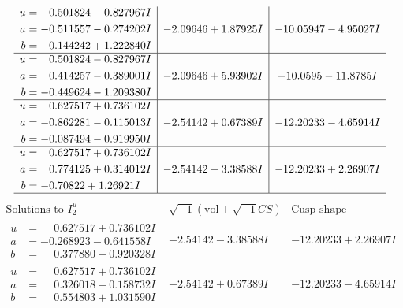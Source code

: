 \documentclass[1p]{elsarticle_modified}
\theoremstyle{definition}
\newcommand{\I}{\sqrt{-1}}
\begin{document}
$$\begin{array}{c|c|c}
\begin{aligned}
u &= \phantom{-}0.501824 - 0.827967 I \\
a &= -0.511557 - 0.274202 I \\
b &= -0.144242 + 1.222840 I\end{aligned}
 & -2.09646 + 1.87925 I & -10.05947 - 4.95027 I \\ \hline\begin{aligned}
u &= \phantom{-}0.501824 - 0.827967 I \\
a &= \phantom{-}0.414257 - 0.389001 I \\
b &= -0.449624 - 1.209380 I\end{aligned}
 & -2.09646 + 5.93902 I & -10.0595 - 11.8785 I \\ \hline\begin{aligned}
u &= \phantom{-}0.627517 + 0.736102 I \\
a &= -0.862281 - 0.115013 I \\
b &= -0.087494 - 0.919950 I\end{aligned}
 & -2.54142 + 0.67389 I & -12.20233 - 4.65914 I \\ \hline\begin{aligned}
u &= \phantom{-}0.627517 + 0.736102 I \\
a &= \phantom{-}0.774125 + 0.314012 I \\
b &= -0.70822 + 1.26921 I\end{aligned}
 & -2.54142 - 3.38588 I & -12.20233 + 2.26907 I\\
 \hline 
 \end{array}$$\newpage$$\begin{array}{c|c|c}  
\text{Solutions to }I^u_{2}& \I (\text{vol} + \sqrt{-1}CS) & \text{Cusp shape}\\
 \hline 
\begin{aligned}
u &= \phantom{-}0.627517 + 0.736102 I \\
a &= -0.268923 - 0.641558 I \\
b &= \phantom{-}0.377880 - 0.920328 I\end{aligned}
 & -2.54142 - 3.38588 I & -12.20233 + 2.26907 I \\ \hline\begin{aligned}
u &= \phantom{-}0.627517 + 0.736102 I \\
a &= \phantom{-}0.326018 - 0.158732 I \\
b &= \phantom{-}0.554803 + 1.031590 I\end{aligned}
 & -2.54142 + 0.67389 I & -12.20233 - 4.65914 I \\ \hline\begin{aligned}

\end{aligned}
\end{array}$$
\end{document}
